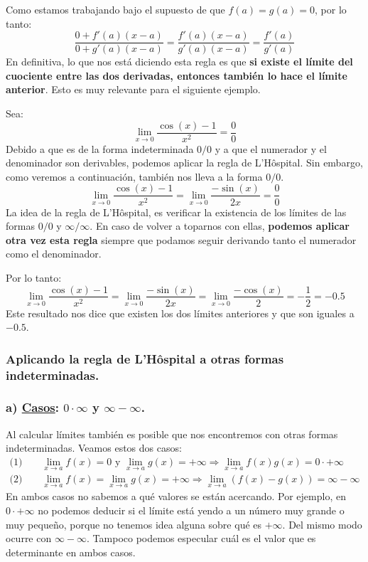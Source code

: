 \documentclass[12pt]{article}
\begin{document}
\newpage

Como estamos trabajando bajo el supuesto de que $f(a) = g(a) = 0$, por lo tanto:
\[
	\frac{0 + f'(a)(x - a)}{0 + g'(a)(x - a)} = 
	\frac{f'(a)(x - a)}{g'(a)(x - a)} = 
	\frac{f'(a)}{g'(a)}
\]
En definitiva, lo que nos está diciendo esta regla es que \textbf{si existe el límite del cuociente entre las dos derivadas, entonces también lo hace el límite anterior}. Esto es muy relevante para el siguiente ejemplo.

Sea: 
\[
	\lim_{x \to 0} \frac{\cos(x) - 1}{x^{2}} = \frac{0}{0}
\]
Debido a que es de la forma indeterminada $0/0$ y a que el numerador y el denominador son derivables, podemos aplicar la regla de L'Hôspital. Sin embargo, como veremos a continuación, también nos lleva a la forma $0/0$.
\[
	\lim_{x \to 0} \frac{\cos(x) - 1}{x^{2}} =
	\lim_{x \to 0} \frac{-\sin(x)}{2x} =
	\frac{0}{0}
\]
La idea de la regla de L'Hôspital, es verificar la existencia de los límites de las formas $0/0$ y $\infty/\infty$. En caso de volver a toparnos con ellas, \textbf{podemos aplicar otra vez esta regla} siempre que podamos seguir derivando tanto el numerador como el denominador.

Por lo tanto:
\[
	\lim_{x \to 0} \frac{\cos(x) - 1}{x^{2}} =
	\lim_{x \to 0} \frac{-\sin(x)}{2x} =
	\lim_{x \to 0} \frac{-\cos(x)}{2} =
	-\frac{1}{2} = -0.5
\]
Este resultado nos dice que existen los dos límites anteriores y que son iguales a $-0.5$.

\subsubsection{Aplicando la regla de L'Hôspital a otras formas indeterminadas.}

\subsubsection*{a) \underline{Casos}: $0 \cdot \infty$ y $\infty - \infty$.}

Al calcular límites también es posible que nos encontremos con otras formas indeterminadas. Veamos estos dos casos:
\begin{align*}
\text{(1) Si }& \lim_{x \to a} f(x) = 0 \text{ y }
			   \lim_{x \to a} g(x) = +\infty \Longrightarrow 
			   \lim_{x \to a} f(x)g(x) = 0 \cdot +\infty \\
\text{(2) Si }& \lim_{x \to a} f(x) = \lim_{x \to a} g(x) = + \infty
			   \Longrightarrow
			   \lim_{x \to a}(f(x) - g(x)) = \infty - \infty
\end{align*}
En ambos casos no sabemos a qué valores se están acercando. Por ejemplo, en $0 \cdot +\infty$ no podemos deducir si el límite está yendo a un número muy grande o muy pequeño, porque no tenemos idea alguna sobre qué es $+\infty$. Del mismo modo ocurre con $\infty - \infty$. Tampoco podemos especular cuál es el valor que es determinante en ambos casos.
\end{document}
